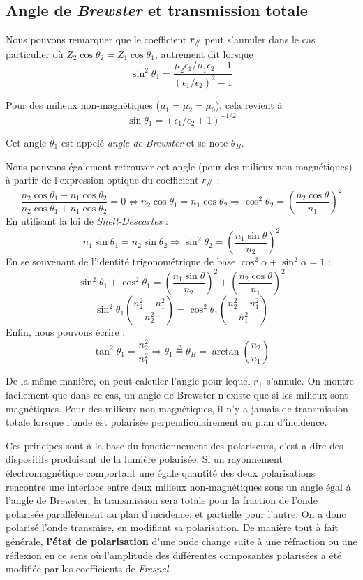\subsection{Angle de \textit{Brewster} et transmission totale}

Nous pouvons remarquer que le coefficient $r_{\mathbin{/\mkern-5mu/}}$ peut s'annuler dans le cas particulier où $Z_2\cos\theta_{2} = Z_1\cos\theta_{1}$, autrement dit lorsque 
\[\sin^2\theta_1 = \frac{\mu_2\epsilon_1/\mu_1\epsilon_2 - 1}{(\epsilon_1/\epsilon_2)^2-1}\]

Pour des milieux non-magnétiques ($\mu_1 = \mu_2 = \mu_0$), cela revient à 
\[\sin\theta_1 = (\epsilon_1/\epsilon_2+1)^{-1/2}\]

Cet angle $\theta_1$ est appelé \textit{angle de Brewster} et se note $\theta_{B}$.

Nous pouvons également retrouver cet angle (pour des milieux non-magnétiques) à partir de l'expression optique du coefficient $r_{\mathbin{/\mkern-5mu/}}$ : 
\[\frac{n_{2}\cos \theta_{1} - n_{1} \cos \theta_{2} }{n_{2} \cos \theta_{1} + n_{1} \cos \theta_{2} } = 0 \Leftrightarrow n_{2} \cos \theta_{1} = n_{1} \cos \theta_{2} \Rightarrow \cos^{2} \theta_{2} = \left(\frac{n_{2} \cos \theta}{n_{1}}\right)^{2}\]
En utilisant la loi de \textit{Snell-Descartes} : 
\[n_{1} \sin \theta_{1} = n_{2} \sin \theta_{2} \Rightarrow \sin^{2} \theta_{2} = \left(\frac{n_{1} \sin \theta}{n_{2}}\right)^{2} \] 
En se souvenant de l'identité trigonométrique de base $ \cos^{2} \alpha + \sin^{2} \alpha = 1$ : 
\[\sin^{2} \theta_{1} + \cos^{2} \theta_{1} = \left(\frac{n_{1} \sin \theta}{n_{2}}\right)^{2} +  \left(\frac{n_{2} \cos \theta}{n_{1}}\right)^{2}\]
\[\sin^{2} \theta_{1} \left(\frac{n_{2}^{2} - n_{1}^{2}}{n_{2}^{2}}\right) = \cos^{2} \theta_{1} \left(\frac{n_{2}^{2} - n_{1}^{2}}{n_{1}^{2}}\right)\]
Enfin, nous pouvons écrire : 
\[\tan^{2} \theta_{1} = \frac{n_{2}^{2}}{n_{1}^{2}} \Rightarrow \theta_{1} \overset{\Delta}= \theta_{B} = \arctan\left(\frac{n_{2}}{n_{1}}\right)\]

De la même manière, on peut calculer l'angle pour lequel $r_{\perp}$ s'annule. On montre facilement que dans ce cas, un angle de Brewster n'existe que si les milieux sont magnétiques. Pour des milieux non-magnétiques, il n'y a jamais de transmission totale lorsque l'onde est polarisée perpendiculairement au plan d'incidence. 

Ces principes sont à la base du fonctionnement des polariseurs, c'est-a-dire des dispositifs produisant de la lumière polarisée. Si un rayonnement électromagnétique comportant une égale quantité des deux polarisations rencontre une interface entre deux milieux non-magnétiques sous un angle égal à l'angle de Brewster, la transmission sera totale pour la fraction de l'onde polarisée parallèlement au plan d'incidence, et partielle pour l'autre. On a donc polarisé l'onde transmise, en modifiant sa polarisation. De manière tout à fait générale, \textbf{l'état de polarisation} d'une onde change suite à une réfraction ou une réflexion en ce sens où l'amplitude des différentes composantes polarisées a été modifiée par les coefficients de \textit{Fresnel}. 

